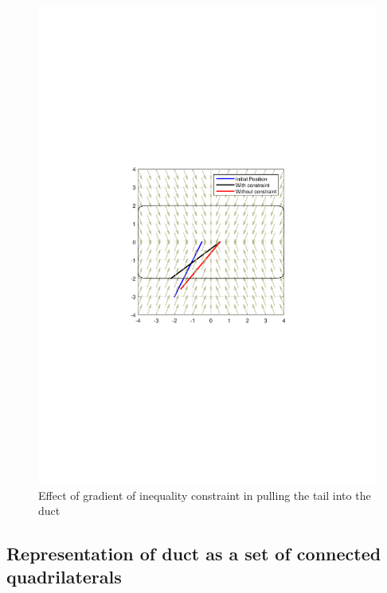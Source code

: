 \documentclass[11pt,a4paper]{article}
\begin{document}
\begin{figure}[h]
\centering
\includegraphics[scale=0.5]{figures/fig6.pdf}
\caption{ Effect of gradient of inequality constraint in pulling the tail into the duct\label{fig:gradienteffectSE}}
\end{figure}


\subsection{Representation of duct as a set of connected quadrilaterals}
\end{document}
